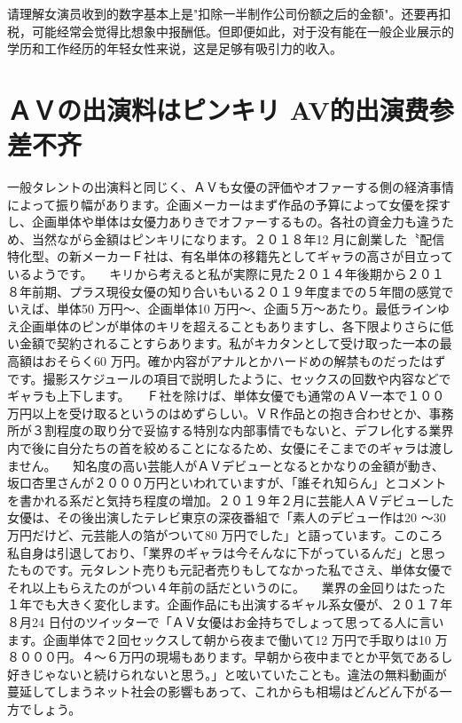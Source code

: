 \documentclass[12pt,UTF8]{ctexbook}
\begin{document}
请理解女演员收到的数字基本上是"扣除一半制作公司份额之后的金额"。还要再扣税，可能经常会觉得比想象中报酬低。但即便如此，对于没有能在一般企业展示的学历和工作经历的年轻女性来说，这是足够有吸引力的收入。



\section{ＡＶの出演料はピンキリ
AV的出演费参差不齐}

一般タレントの出演料と同じく、ＡＶも女優の評価やオファーする側の経済事情によって振り幅があります。企画メーカーはまず作品の予算によって女優を探すし、企画単体や単体は女優力ありきでオファーするもの。各社の資金力も違うため、当然ながら金額はピンキリになります。２０１８年12
 月に創業した〝配信特化型〟の新メーカーＦ社は、有名単体の移籍先としてギャラの高さが目立っているようです。
　キリから考えると私が実際に見た２０１４年後期から２０１８年前期、プラス現役女優の知り合いもいる２０１９年度までの５年間の感覚でいえば、単体50
 万円〜、企画単体10
 万円〜、企画５万〜あたり。最低ラインゆえ企画単体のピンが単体のキリを超えることもありますし、各下限よりさらに低い金額で契約されることすらあります。私がキカタンとして受け取った一本の最高額はおそらく60
 万円。確か内容がアナルとかハードめの解禁ものだったはずです。撮影スケジュールの項目で説明したように、セックスの回数や内容などでギャラも上下します。
　Ｆ社を除けば、単体女優でも通常のＡＶ一本で１００万円以上を受け取るというのはめずらしい。ＶＲ作品との抱き合わせとか、事務所が３割程度の取り分で妥協する特別な内部事情でもないと、デフレ化する業界内で後に自分たちの首を絞めることになるため、女優にそこまでのギャラは渡しません。
　知名度の高い芸能人がＡＶデビューとなるとかなりの金額が動き、坂口杏里さんが２０００万円といわれていますが、「誰それ知らん」とコメントを書かれる系だと気持ち程度の増加。２０１９年２月に芸能人ＡＶデビューした女優は、その後出演したテレビ東京の深夜番組で「素人のデビュー作は20
 〜30
 万円だけど、元芸能人の箔がついて80
 万円でした」と語っています。このころ私自身は引退しており、「業界のギャラは今そんなに下がっているんだ」と思ったものです。元タレント売りも元記者売りもしてなかった私でさえ、単体女優でそれ以上もらえたのがつい４年前の話だというのに。
　業界の金回りはたった１年でも大きく変化します。企画作品にも出演するギャル系女優が、２０１７年８月24
 日付のツイッターで「ＡＶ女優はお金持ちでしょって思ってる人に言います。企画単体で２回セックスして朝から夜まで働いて12
 万円で手取りは10
 万８０００円。４〜６万円の現場もあります。早朝から夜中までとか平気であるし好きじゃないと続けられないと思う。」と呟いていたことも。違法の無料動画が蔓延してしまうネット社会の影響もあって、これからも相場はどんどん下がる一方でしょう。
\end{document}
